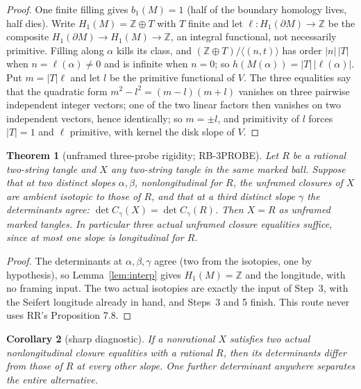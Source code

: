 \documentclass[11pt]{amsart}
\newtheorem{theorem}{Theorem}[section]
\newtheorem{corollary}[theorem]{Corollary}
\theoremstyle{remark}
\newcommand{\Z}{\mathbb{Z}}
\DeclareMathOperator{\dt}{det}
\begin{document}
\begin{proof}
One finite filling gives $b_1(M)=1$ (half of the boundary homology lives, half dies). Write $H_1(M)=\Z\oplus T$ with $T$ finite and let $\ell\colon H_1(\partial M)\to\Z$ be the composite $H_1(\partial M)\to H_1(M)\to\Z$, an integral functional, not necessarily primitive. Filling along $\alpha$ kills its class, and $(\Z\oplus T)/\langle(n,t)\rangle$ has order $|n|\,|T|$ when $n=\ell(\alpha)\neq 0$ and is infinite when $n=0$; so $h(M(\alpha))=|T|\,|\ell(\alpha)|$. Put $m=|T|\ell$ and let $l$ be the primitive functional of $V$. The three equalities say that the quadratic form $m^2-l^2=(m-l)(m+l)$ vanishes on three pairwise independent integer vectors; one of the two linear factors then vanishes on two independent vectors, hence identically; so $m=\pm l$, and primitivity of $l$ forces $|T|=1$ and $\ell$ primitive, with kernel the disk slope of $V$.
\end{proof}

\begin{theorem}[unframed three-probe rigidity; RB-3PROBE]\label{thm:3probe}
Let $R$ be a rational two-string tangle and $X$ any two-string tangle in the same marked ball. Suppose that at two distinct slopes $\alpha,\beta$, nonlongitudinal for $R$, the unframed closures of $X$ are ambient isotopic to those of $R$, and that at a third distinct slope $\gamma$ the determinants agree: $\dt C_\gamma(X)=\dt C_\gamma(R)$. Then $X=R$ as unframed marked tangles. In particular three actual unframed closure equalities suffice, since at most one slope is longitudinal for $R$.
\end{theorem}

\begin{proof}
The determinants at $\alpha,\beta,\gamma$ agree (two from the isotopies, one by hypothesis), so Lemma~\ref{lem:interp} gives $H_1(M)=\Z$ and the longitude, with no framing input. The two actual isotopies are exactly the input of Step~3, with the Seifert longitude already in hand, and Steps~3 and 5 finish. This route never uses RR's Proposition 7.8.
\end{proof}

\begin{corollary}[sharp diagnostic]
If a nonrational $X$ satisfies two actual nonlongitudinal closure equalities with a rational $R$, then its determinants differ from those of $R$ at every other slope. One further determinant anywhere separates the entire alternative.
\end{corollary}
\end{document}
